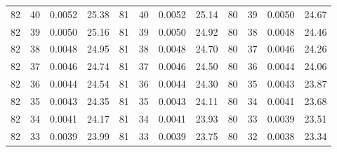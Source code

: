\begin{tabular}{llll|llll|llll}
82 & 40 & 0.0052 & 25.38 & 81 & 40 & 0.0052 & 25.14 & 80 & 39 & 0.0050 & 24.67\\
82 & 39 & 0.0050 & 25.16 & 81 & 39 & 0.0050 & 24.92 & 80 & 38 & 0.0048 & 24.46\\
82 & 38 & 0.0048 & 24.95 & 81 & 38 & 0.0048 & 24.70 & 80 & 37 & 0.0046 & 24.26\\
82 & 37 & 0.0046 & 24.74 & 81 & 37 & 0.0046 & 24.50 & 80 & 36 & 0.0044 & 24.06\\
82 & 36 & 0.0044 & 24.54 & 81 & 36 & 0.0044 & 24.30 & 80 & 35 & 0.0043 & 23.87\\
82 & 35 & 0.0043 & 24.35 & 81 & 35 & 0.0043 & 24.11 & 80 & 34 & 0.0041 & 23.68\\
82 & 34 & 0.0041 & 24.17 & 81 & 34 & 0.0041 & 23.93 & 80 & 33 & 0.0039 & 23.51\\
82 & 33 & 0.0039 & 23.99 & 81 & 33 & 0.0039 & 23.75 & 80 & 32 & 0.0038 & 23.34\\
\bottomrule
\end{tabular}
\newpage
